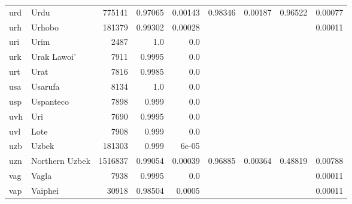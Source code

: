\documentclass[11pt]{article}
\begin{document}
\begin{table*}[h]
{\begin{tabular}{llrrrrrrr}
urd         & Urdu         & 775141         & 0.97065         & 0.00143         & 0.98346         & 0.00187         & 0.96522         & 0.00077         \\

urh         & Urhobo         & 181379         & 0.99302         & 0.00028         &          &          &          & 0.00011         \\

uri         & Urim         & 2487         & 1.0         & 0.0         &          &          &          &          \\

urk         & Urak Lawoi'         & 7911         & 0.9995         & 0.0         &          &          &          &          \\

urt         & Urat         & 7816         & 0.9985         & 0.0         &          &          &          &          \\

usa         & Usarufa         & 8134         & 1.0         & 0.0         &          &          &          &          \\

usp         & Uspanteco         & 7898         & 0.999         & 0.0         &          &          &          &          \\

uvh         & Uri         & 7690         & 0.9995         & 0.0         &          &          &          &          \\

uvl         & Lote         & 7908         & 0.999         & 0.0         &          &          &          &          \\

uzb         & Uzbek         & 181303         & 0.999         & 6e-05         &          &          &          &          \\

uzn         & Northern Uzbek         & 1516837         & 0.99054         & 0.00039         & 0.96885         & 0.00364         & 0.48819         & 0.00788         \\

vag         & Vagla         & 7938         & 0.9995         & 0.0         &          &          &          & 0.00011         \\

vap         & Vaiphei         & 30918         & 0.98504         & 0.0005         &          &          &          & 0.00011         \\


\end{tabular}}
\end{table*}
\end{document}
